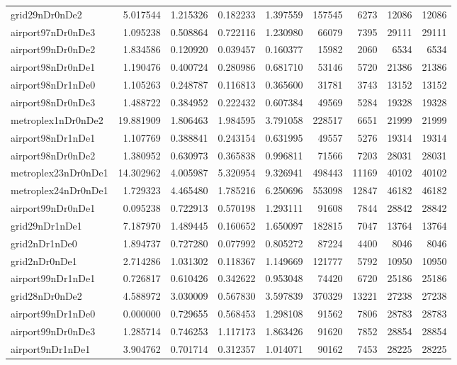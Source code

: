\begin{longtable}{|l|r|r|r|r|r|r|r|r|}
grid29nDr0nDe2 & 5.017544 & 1.215326 & 0.182233 & 1.397559 & 157545 & 6273 & 12086 & 12086 \\
airport97nDr0nDe3 & 1.095238 & 0.508864 & 0.722116 & 1.230980 & 66079 & 7395 & 29111 & 29111 \\
airport99nDr0nDe2 & 1.834586 & 0.120920 & 0.039457 & 0.160377 & 15982 & 2060 & 6534 & 6534 \\
airport98nDr0nDe1 & 1.190476 & 0.400724 & 0.280986 & 0.681710 & 53146 & 5720 & 21386 & 21386 \\
airport98nDr1nDe0 & 1.105263 & 0.248787 & 0.116813 & 0.365600 & 31781 & 3743 & 13152 & 13152 \\
airport98nDr0nDe3 & 1.488722 & 0.384952 & 0.222432 & 0.607384 & 49569 & 5284 & 19328 & 19328 \\
metroplex1nDr0nDe2 & 19.881909 & 1.806463 & 1.984595 & 3.791058 & 228517 & 6651 & 21999 & 21999 \\
airport98nDr1nDe1 & 1.107769 & 0.388841 & 0.243154 & 0.631995 & 49557 & 5276 & 19314 & 19314 \\
airport98nDr0nDe2 & 1.380952 & 0.630973 & 0.365838 & 0.996811 & 71566 & 7203 & 28031 & 28031 \\
metroplex23nDr0nDe1 & 14.302962 & 4.005987 & 5.320954 & 9.326941 & 498443 & 11169 & 40102 & 40102 \\
metroplex24nDr0nDe1 & 1.729323 & 4.465480 & 1.785216 & 6.250696 & 553098 & 12847 & 46182 & 46182 \\
airport99nDr0nDe1 & 0.095238 & 0.722913 & 0.570198 & 1.293111 & 91608 & 7844 & 28842 & 28842 \\
grid29nDr1nDe1 & 7.187970 & 1.489445 & 0.160652 & 1.650097 & 182815 & 7047 & 13764 & 13764 \\
grid2nDr1nDe0 & 1.894737 & 0.727280 & 0.077992 & 0.805272 & 87224 & 4400 & 8046 & 8046 \\
grid2nDr0nDe1 & 2.714286 & 1.031302 & 0.118367 & 1.149669 & 121777 & 5792 & 10950 & 10950 \\
airport99nDr1nDe1 & 0.726817 & 0.610426 & 0.342622 & 0.953048 & 74420 & 6720 & 25186 & 25186 \\
grid28nDr0nDe2 & 4.588972 & 3.030009 & 0.567830 & 3.597839 & 370329 & 13221 & 27238 & 27238 \\
airport99nDr1nDe0 & 0.000000 & 0.729655 & 0.568453 & 1.298108 & 91562 & 7806 & 28783 & 28783 \\
airport99nDr0nDe3 & 1.285714 & 0.746253 & 1.117173 & 1.863426 & 91620 & 7852 & 28854 & 28854 \\
airport9nDr1nDe1 & 3.904762 & 0.701714 & 0.312357 & 1.014071 & 90162 & 7453 & 28225 & 28225 \\

\end{longtable}
